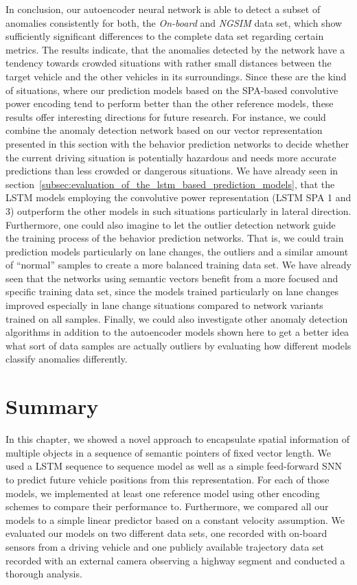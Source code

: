 In conclusion, our autoencoder neural network is able to detect a subset of anomalies consistently for both, the \emph{On-board} and \emph{\ac{NGSIM}} data set, which show sufficiently significant differences to the complete data set regarding certain metrics.
The results indicate, that the anomalies detected by the network have a tendency towards crowded situations with rather small distances between the target vehicle and the other vehicles in its surroundings.
Since these are the kind of situations, where our prediction models based on the \ac{SPA}-based convolutive power encoding tend to perform better than the other reference models, these results offer interesting directions for future research.
For instance, we could combine the anomaly detection network based on our vector representation presented in this section with the behavior prediction networks to decide whether the current driving situation is potentially hazardous and needs more accurate predictions than less crowded or dangerous situations. 
We have already seen in section~\ref{subsec:evaluation_of_the_lstm_based_prediction_models}, that the \ac{LSTM} models employing the convolutive power representation (\ac{LSTM} \ac{SPA} \num{1} and \num{3}) outperform the other models in such situations particularly in lateral direction. 
Furthermore, one could also imagine to let the outlier detection network guide the training process of the behavior prediction networks.
That is, we could train prediction models particularly on lane changes, the outliers and a similar amount of \enquote{normal} samples to create a more balanced training data set.
We have already seen that the networks using semantic vectors benefit from a more focused and specific training data set, since the models trained particularly on lane changes improved especially in lane change situations compared to network variants trained on all samples.
Finally, we could also investigate other anomaly detection algorithms in addition to the autoencoder models shown here to get a better idea what sort of data samples are actually  outliers by evaluating how different models classify anomalies differently.

\section{Summary}%
\label{sec:summary_behavior_prediction}

In this chapter, we showed a novel approach to encapsulate spatial information of multiple objects in a sequence of semantic pointers of fixed vector length.
We used a \ac{LSTM} sequence to sequence model as well as a simple feed-forward \acl{SNN} to predict future vehicle positions from this representation.
For each of those models, we implemented at least one reference model using other encoding schemes to compare their performance to.
Furthermore, we compared all our models to a simple linear predictor based on a constant velocity assumption.
We evaluated our models on two different data sets, one recorded with on-board sensors from a driving vehicle and one publicly available trajectory data set recorded with an external camera observing a highway segment and conducted a thorough analysis.

